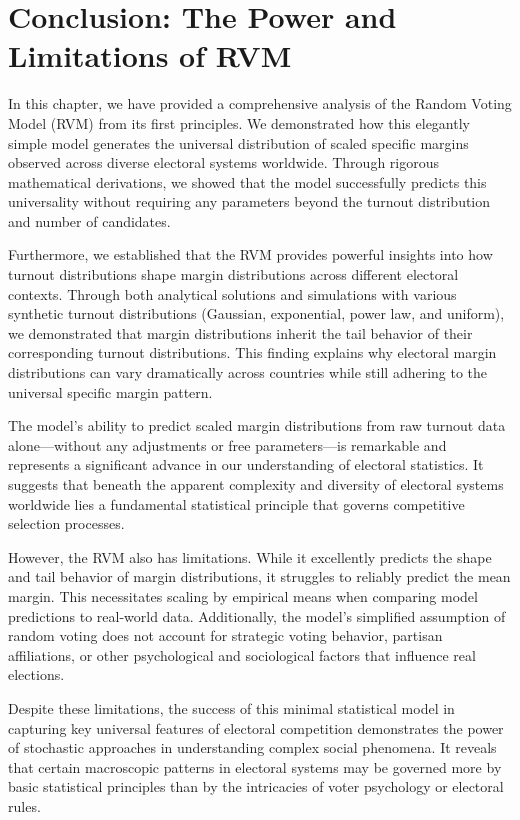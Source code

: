\begin{figure}
    
\end{figure}

\section{Conclusion: The Power and Limitations of RVM}

In this chapter, we have provided a comprehensive analysis of the Random Voting Model (RVM) from its first principles. We demonstrated how this elegantly simple model generates the universal distribution of scaled specific margins observed across diverse electoral systems worldwide. Through rigorous mathematical derivations, we showed that the model successfully predicts this universality without requiring any parameters beyond the turnout distribution and number of candidates.

Furthermore, we established that the RVM provides powerful insights into how turnout distributions shape margin distributions across different electoral contexts. Through both analytical solutions and simulations with various synthetic turnout distributions (Gaussian, exponential, power law, and uniform), we demonstrated that margin distributions inherit the tail behavior of their corresponding turnout distributions. This finding explains why electoral margin distributions can vary dramatically across countries while still adhering to the universal specific margin pattern.

The model's ability to predict scaled margin distributions from raw turnout data alone—without any adjustments or free parameters—is remarkable and represents a significant advance in our understanding of electoral statistics. It suggests that beneath the apparent complexity and diversity of electoral systems worldwide lies a fundamental statistical principle that governs competitive selection processes.

However, the RVM also has limitations. While it excellently predicts the shape and tail behavior of margin distributions, it struggles to reliably predict the mean margin. This necessitates scaling by empirical means when comparing model predictions to real-world data. Additionally, the model's simplified assumption of random voting does not account for strategic voting behavior, partisan affiliations, or other psychological and sociological factors that influence real elections.

Despite these limitations, the success of this minimal statistical model in capturing key universal features of electoral competition demonstrates the power of stochastic approaches in understanding complex social phenomena. It reveals that certain macroscopic patterns in electoral systems may be governed more by basic statistical principles than by the intricacies of voter psychology or electoral rules.

